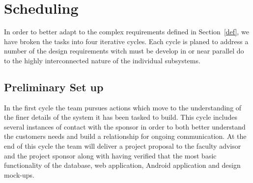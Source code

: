 \documentclass[Letter,11pt]{article}
\begin{document}
\section{Scheduling}
		In order to better adapt to the complex requirements defined in Section~\ref{def}, we have broken the tasks into four iterative cycles. Each cycle is planed to address a number of the design requirements witch must be develop in or near parallel do to the highly interconnected nature of the individual subsystems. 
		
		
	\subsection{Preliminary Set up}\label{cyc1}
		In the first cycle the team pursues actions which move to the understanding of the finer details of the system it has been tasked to build. This cycle includes several instances of contact with the sponsor in order to both better understand the customers needs and build a relationship for ongoing communication. At the end of this cycle the team will deliver a project proposal to the faculty advisor and the project sponsor along with having verified that the most basic functionality of the database, web application, Android application and design mock-ups. 
		
\end{document}
